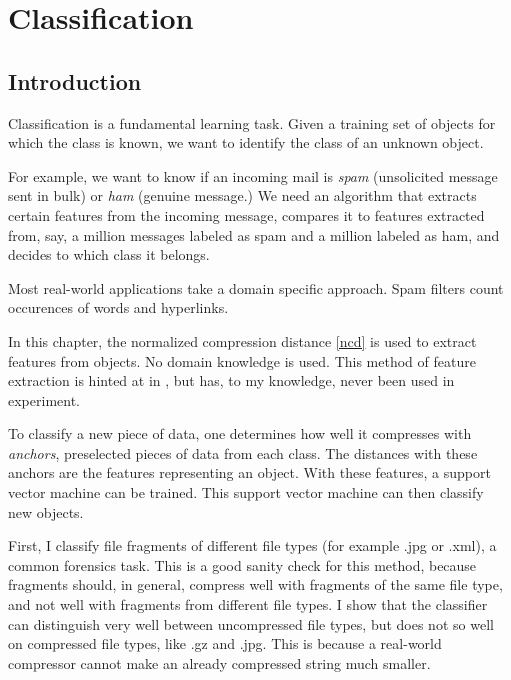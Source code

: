 
\chapter{Classification} %

\label{Chapter4} %


\section{Introduction}

Classification is a fundamental learning task. Given a training
set of objects for which the class is known, we want to identify the class
of an unknown object.

For example, we want to know if an incoming mail is \emph{spam}
(unsolicited message sent in bulk) or \emph{ham} (genuine message.) We
need an algorithm that extracts certain features from the incoming
message, compares it to features extracted from, say, a million messages
labeled as spam and a million labeled as ham, and decides to which class
it belongs.

Most real-world applications take a domain specific approach. Spam filters
count occurences of words and hyperlinks.

In this chapter, the normalized compression distance \eqref{ncd} is used
to extract features from objects. No domain knowledge is used. This method of feature extraction is hinted at in \cite{Cilibrasi2007}, but has, to my knowledge, never been used in experiment.

To classify a new piece of data, one determines how well it compresses with \emph{anchors}, preselected pieces of data from each class. The distances with these anchors are the features representing an object. With these features, a support vector machine can be trained. This support vector machine can then classify new objects.

First, I classify file fragments of different file types (for example .jpg or .xml), a common forensics task. This is a good sanity check for this method, because fragments should, in general, compress well with fragments of the same file type, and not well with fragments from different file types. I show that the classifier can distinguish very well between uncompressed file types, but does not so well on compressed file types, like .gz and .jpg. This is because a real-world compressor cannot make an already compressed string much smaller.

